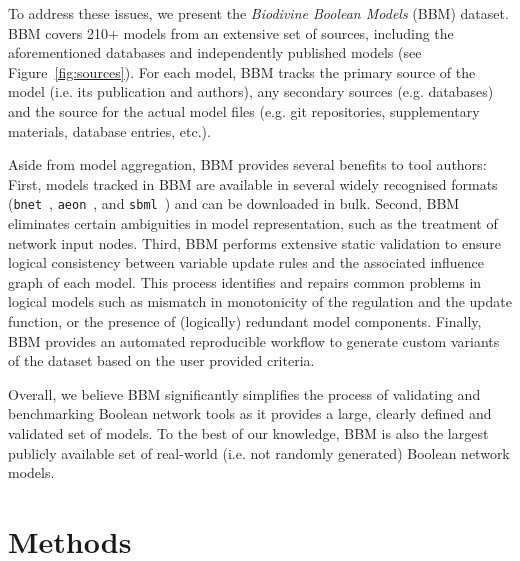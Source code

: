 \documentclass[fleqn,10pt]{wlscirep}
\begin{document}

To address these issues, we present the \emph{Biodivine Boolean Models} (BBM) dataset. BBM covers 210+ models from an extensive set of sources, including the aforementioned databases and independently published models (see Figure~\ref{fig:sources}). For each model, BBM tracks the primary source of the model (i.e. its publication and authors), any secondary sources (e.g. databases) and the source for the actual model files (e.g. git repositories, supplementary materials, database entries, etc.). 

Aside from model aggregation, BBM provides several benefits to tool authors: First, models tracked in BBM are available in several widely recognised formats (\texttt{bnet}~\cite{pyboolnet}, \texttt{aeon}~\cite{aeon}, and \texttt{sbml}~\cite{sbml-qual}) and can be downloaded in bulk. Second, BBM eliminates certain ambiguities in model representation, such as the treatment of network input nodes. Third, BBM performs extensive static validation to ensure logical consistency between variable update rules and the associated influence graph of each model. This process identifies and repairs common problems in logical models such as mismatch in monotonicity of the regulation and the update function, or the presence of (logically) redundant model components. Finally, BBM provides an automated reproducible workflow to generate custom variants of the dataset based on the user provided criteria.

Overall, we believe BBM significantly simplifies the process of validating and benchmarking Boolean network tools as it provides a large, clearly defined and validated set of models. To the best of our knowledge, BBM is also the largest publicly available set of real-world (i.e. not randomly generated) Boolean network models.


\section*{Methods}
\end{document}
